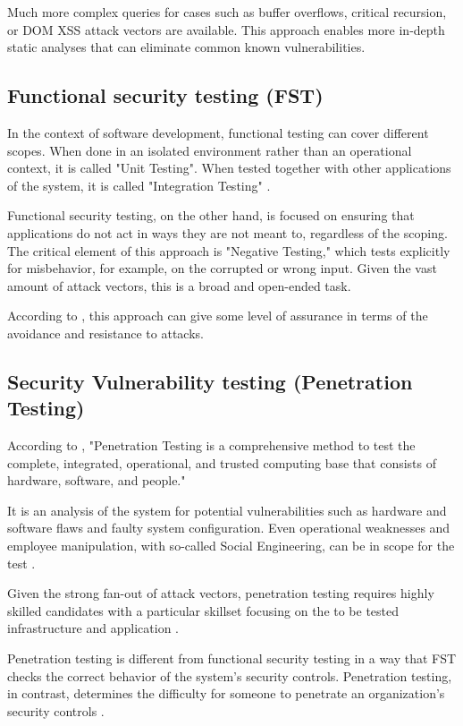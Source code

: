 Much more complex queries for cases such as buffer overflows, critical recursion, or DOM XSS attack vectors are available. 
This approach enables more in-depth static analyses that can eliminate common known vulnerabilities.


\subsection{Functional security testing (FST)}
In the context of software development, functional testing can cover different scopes. When done in an isolated environment rather than an operational context, it is called "Unit Testing". When tested together with other applications of the system, it is called "Integration Testing" \citep{warren2011}.

Functional security testing, on the other hand, is focused on ensuring that applications do not act in ways they are not meant to, regardless of the scoping. The critical element of this approach is "Negative Testing," which tests explicitly for misbehavior, for example, on the corrupted or wrong input. Given the vast amount of attack vectors, this is a broad and open-ended task.

According to \citep{warren2011}, this approach can give some level of assurance in terms of the avoidance and resistance to attacks.


\subsection{Security Vulnerability testing (Penetration Testing)}
\label{securityVulnerabilityTesting}
According to \citep{mcgraw2006}, "Penetration Testing is a comprehensive method to test the complete, integrated, operational, and trusted computing base that consists of hardware, software, and people."

It is an analysis of the system for potential vulnerabilities such as hardware and software flaws and faulty system configuration. Even operational weaknesses and employee manipulation, with so-called Social Engineering, can be in scope for the test \citep{mohanty2020}.

Given the strong fan-out of attack vectors, penetration testing requires highly skilled candidates with a particular skillset focusing on the to be tested infrastructure and application \citep{bacuidoYuanChuJones2011}.

Penetration testing is different from functional security testing in a way that FST checks the correct behavior of the system's security controls. Penetration testing, in contrast, determines the difficulty for someone to penetrate an organization's security controls \citep{autoPentestOverview2018}.

